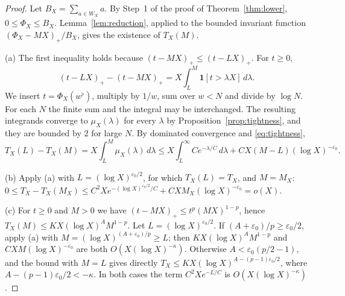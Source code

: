 \begin{proof}
Let $B_X=\sum_{a\in W_X}a$. By Step~1 of the proof of
Theorem~\ref{thm:lower}, $0\le\Phi_X\le B_X$. Lemma~\ref{lem:reduction},
applied to the bounded invariant function $(\Phi_X-MX)_+/B_X$, gives the
existence of $T_X(M)$.

(a) The first inequality holds because $(t-MX)_+\le(t-LX)_+$. For
$t\ge0$,
\[
 (t-LX)_+-(t-MX)_+=X\int_L^M\mathbf 1[t>\lambda X]\,d\lambda .
\]
We insert $t=\Phi_X(w^\flat)$, multiply by $1/w$, sum over $w<N$ and
divide by $\log N$. For each $N$ the finite sum and the integral may be
interchanged. The resulting integrands converge to $\mu_X(\lambda)$ for
every $\lambda$ by Proposition~\ref{prop:tightness}, and they are bounded
by $2$ for large $N$. By dominated convergence and \eqref{eq:tightness},
\[
 T_X(L)-T_X(M)=X\int_L^M\mu_X(\lambda)\,d\lambda
 \le X\int_L^\infty Ce^{-\lambda/C}\,d\lambda+CX(M-L)(\log X)^{-\varepsilon_0}.
\]

(b) Apply (a) with $L=(\log X)^{\varepsilon_0/2}$, for which
$T_X(L)=T_X$, and $M=M_X$:
$0\le T_X-T_X(M_X)\le C^2Xe^{-(\log X)^{\varepsilon_0/2}/C}
+CXM_X(\log X)^{-\varepsilon_0}=o(X)$.

(c) For $t\ge0$ and $M>0$ we have $(t-MX)_+\le t^p(MX)^{1-p}$, hence
$T_X(M)\le KX(\log X)^AM^{1-p}$. Let $L=(\log X)^{\varepsilon_0/2}$. If
$(A+\varepsilon_0)/p\ge\varepsilon_0/2$, apply (a) with
$M=(\log X)^{(A+\varepsilon_0)/p}\ge L$; then
$KX(\log X)^AM^{1-p}$ and $CXM(\log X)^{-\varepsilon_0}$ are both
$O(X(\log X)^{-\kappa})$. Otherwise $A<\varepsilon_0(p/2-1)$, and the
bound with $M=L$ gives directly
$T_X\le KX(\log X)^{A-(p-1)\varepsilon_0/2}$, where
$A-(p-1)\varepsilon_0/2<-\kappa$. In both cases the term
$C^2Xe^{-L/C}$ is $O(X(\log X)^{-\kappa})$.
\end{proof}

